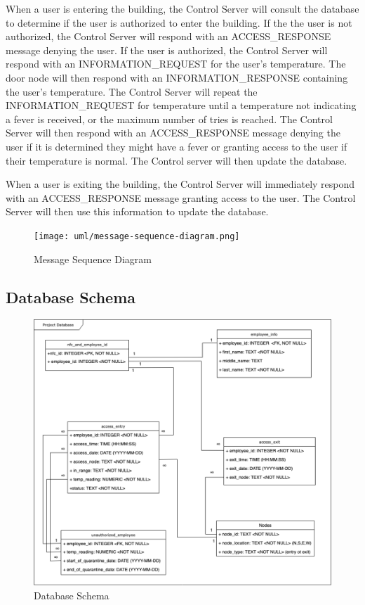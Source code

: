 When a user is entering the building, the Control Server will consult the
database to determine if the user is authorized to enter the building.  If the
the user is not authorized, the Control Server will respond with an
ACCESS\_RESPONSE message denying the user.  If the user is authorized, the
Control Server will respond with an INFORMATION\_REQUEST for the user's
temperature.  The door node will then respond with an INFORMATION\_RESPONSE
containing the user's temperature.  The Control Server will repeat the
INFORMATION\_REQUEST for temperature until a temperature not indicating a fever
is received, or the maximum number of tries is reached.  The Control Server
will then respond with an ACCESS\_RESPONSE message denying the user if it is
determined they might have a fever or granting access to the user if their
temperature is normal.  The Control server will then update the database.

When a user is exiting the building, the Control Server will immediately respond
with an ACCESS\_RESPONSE message granting access to the user.  The Control
Server will then use this information to update the database.

\begin{figure}[!htb]
\centering
\texttt{[image: uml/message-sequence-diagram.png]}
\caption{Message Sequence Diagram}
\label{fig:message-sequence-diagram}
\end{figure}

\subsection{Database Schema}

\begin{figure}[!htb]
\includegraphics[width=\textwidth]{images/db-schema.png}
\caption{Database Schema}
\end{figure}

